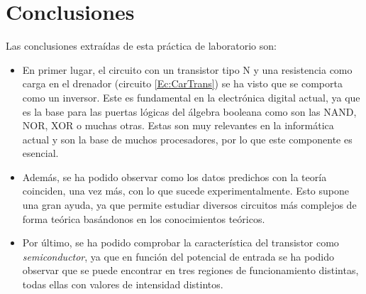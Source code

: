 \section{Conclusiones}
Las conclusiones extraídas de esta práctica de laboratorio son:
\begin{itemize}
    \item En primer lugar, el circuito con un transistor tipo N y una resistencia como carga en el drenador (circuito \ref{Ec:CarTrans}) se ha visto que se comporta como un inversor. Este es fundamental en la electrónica digital actual, ya que es la base para las puertas lógicas del álgebra booleana como son las NAND, NOR, XOR o muchas otras. Estas son muy relevantes en la informática actual y son la base de muchos procesadores, por lo que este componente es esencial.

    \item Además, se ha podido observar como los datos predichos con la teoría coinciden, una vez más, con lo que sucede experimentalmente. Esto supone una gran ayuda, ya que permite estudiar diversos circuitos más complejos de forma teórica basándonos en los conocimientos teóricos.

    \item Por último, se ha podido comprobar la característica del transistor como \emph{semiconductor}, ya que en función del potencial de entrada se ha podido observar que se puede encontrar en tres regiones de funcionamiento distintas, todas ellas con valores de intensidad distintos.
\end{itemize}